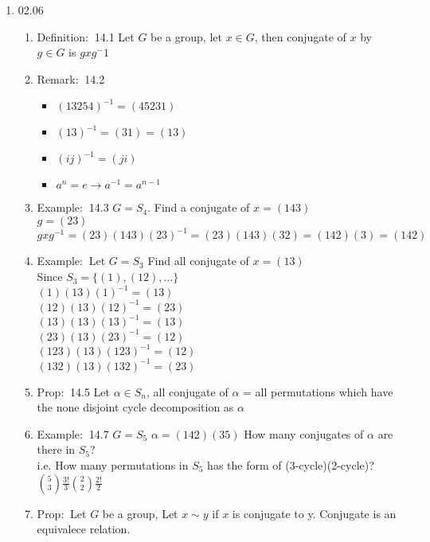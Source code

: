 \documentclass[12pt]{article}
\newcommand{\defi}{{\color{blue} Definition: $\ $}}
\newcommand{\exe}{{\color{green} Example: $\ $}}
\newcommand{\prop}{{\color{blue} Prop: $\ $}}
\newcommand{\rem}{{\color{blue} Remark: $\ $}}
\begin{document}
\begin{enumerate}
    \item 02.06
    
    \begin{enumerate}
        \item \defi 14.1 Let $G$ be a group, let $x \in G$, then conjugate of $x$ by $g\in G$ is $gxg^-1$
        \item \rem 14.2 
        \begin{itemize}
            \item $(13254)^{-1} = (45231)$
            \item $(13)^{-1} = (31) = (13)$ 
            \item $(ij)^{-1} = (ji)$
            \item $a^n = e\rightarrow a^{-1} = a^{n-1}$
        \end{itemize}
        \item \exe 14.3 $G = S_4$. Find a conjugate of $x = (143)$\\
        $g = (23)$ $gxg^{-1} = (23)(143)(23)^{-1} = (23)(143)(32) = (142)(3) = (142)$

        \item \exe Let $G= S_3$ Find all conjugate of $x = (13)$\\
        Since $S_3 = \{(1), (12), \dots\}$\\
        $(1)(13)(1)^{-1} = (13)$\\
        $(12)(13)(12)^{-1} = (23)$\\
        $(13)(13)(13)^{-1} = (13)$\\
        $(23)(13)(23)^{-1} = (12)$\\
        $(123)(13)(123)^{-1} = (12)$\\
        $(132)(13)(132)^{-1} = (23)$\\

        \item \prop 14.5 Let $\alpha \in S_n$, all conjugate of $\alpha$ = all permutations which have the none disjoint cycle decomposition as $\alpha$
        
        \item \exe 14.7 $G= S_5$ $\alpha = (142)(35)$ How many conjugates of $\alpha$ are there in $S_5$?\\
        i.e. How many permutations in $S_5$ has the form of (3-cycle)(2-cycle)? ${5 \choose 3}\frac{3!}{3} {2 \choose 2}\frac{2!}{2}$

        \item \prop Let $G$ be a group, Let $x \sim  y$ if $x$ is conjugate to y. Conjugate is an equivalece relation.
        

\end{enumerate}
\end{enumerate}
\end{document}
